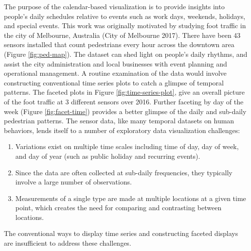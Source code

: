 The purpose of the calendar-based visualization is to provide insights
into people's daily schedules relative to events such as work days,
weekends, holidays, and special events. This work was originally
motivated by studying foot traffic in the city of Melbourne, Australia
(City of Melbourne 2017). There have been 43 sensors installed that
count pedestrians every hour across the downtown area (Figure
\ref{fig:ped-map}). The dataset can shed light on people's daily
rhythms, and assist the city administration and local businesses with
event planning and operational management. A routine examination of the
data would involve constructing conventional time series plots to catch
a glimpse of temporal patterns. The faceted plots in Figure
\ref{fig:time-series-plot}, give an overall picture of the foot traffic
at 3 different sensors over 2016. Further faceting by day of the week
(Figure \ref{fig:facet-time}) provides a better glimpse of the daily and
sub-daily pedestrian patterns. The sensor data, like many temporal
datasets on human behaviors, lends itself to a number of exploratory
data visualization challenges:

\begin{enumerate}
\def\labelenumi{\arabic{enumi}.}
\tightlist
\item
  Variations exist on multiple time scales including time of day, day of
  week, and day of year (such as public holiday and recurring events).
\item
  Since the data are often collected at sub-daily frequencies, they
  typically involve a large number of observations.
\item
  Measurements of a single type are made at multiple locations at a
  given time point, which creates the need for comparing and contrasting
  between locations.
\end{enumerate}

The conventional ways to display time series and constructing faceted
displays are insufficient to address these challenges.

